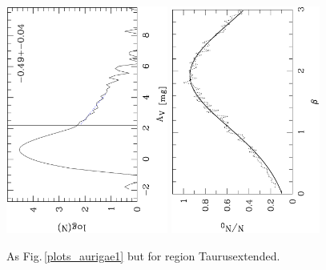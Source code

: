 \documentclass[useAMS,usenatbib]{mn2e}
\begin{document}
\begin{appendix}
\begin{figure}
\includegraphics[height=7.5cm,angle=-90]{av_dist_taurusextended.ps}
\hfill
\includegraphics[height=7.5cm,angle=-90]{histo_taurusextended.ps}
\caption{\label{plots_taurusextended} As Fig.\,\ref{plots_aurigae1} but for
region Taurusextended.}  
\end{figure}



\end{appendix}
\end{document}
